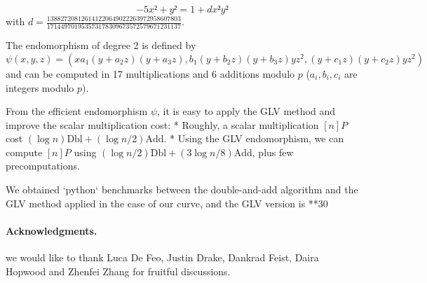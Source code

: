 \documentclass{amsart}
\begin{document}
$$-5x²+y² = 1+dx²y²$$ with $d=\frac{138827208126141220649022263972958607803}{171449701953573178309673572579671231137}$.

\medskip
The endomorphism of degree 2 is defined by
$$\psi(x,y,z) = (xa_1(y+a_2z)(y+a_3z), b_1(y+b_2z)(y+b_3z)yz^2, (y+c_1z)(y+c_2z)yz^2)$$
and can be computed in 17 multiplications and 6 additions modulo $p$ ($a_i, b_i, c_i$ are integers modulo $p$).

From the efficient endomorphism $\psi$, it is easy to apply the GLV method and improve the scalar multiplication cost:
* Roughly, a scalar multiplication $[n]P$ cost $(\log n) \text{Dbl} + (\log n/2) \text{Add}$.
* Using the GLV endomorphism, we can compute $[n]P$ using $(\log n/2 )\text{Dbl} + (3\log n/8) \text{Add}$, plus few precomputations.

We obtained `python` benchmarks between the double-and-add algorithm and the GLV method applied in the case of our curve, and the GLV version is **30%

\bigskip
\paragraph*{\textbf{Acknowledgments.}} we would like to thank Luca De Feo, Justin Drake, Dankrad Feist, Daira Hopwood and Zhenfei Zhang for fruitful discussions.

{}

\end{document}

